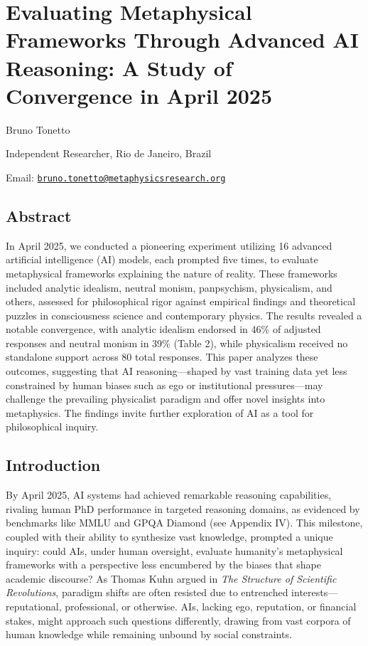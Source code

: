 \section{Evaluating Metaphysical Frameworks Through Advanced AI
Reasoning: A Study of Convergence in April
2025}\label{evaluating-metaphysical-frameworks-through-advanced-ai-reasoning-a-study-of-convergence-in-april-2025}

Bruno Tonetto

Independent Researcher, Rio de Janeiro, Brazil

Email:
\href{mailto:bruno.tonetto@metaphysicsresearch.org}{\nolinkurl{bruno.tonetto@metaphysicsresearch.org}}

\subsection{Abstract}\label{abstract}

In April 2025, we conducted a pioneering experiment utilizing 16
advanced artificial intelligence (AI) models, each prompted five times,
to evaluate metaphysical frameworks explaining the nature of reality.
These frameworks included analytic idealism, neutral monism,
panpsychism, physicalism, and others, assessed for philosophical rigor
against empirical findings and theoretical puzzles in consciousness
science and contemporary physics. The results revealed a notable
convergence, with analytic idealism endorsed in 46\% of adjusted
responses and neutral monism in 39\% (Table 2), while physicalism
received no standalone support across 80 total responses. This paper
analyzes these outcomes, suggesting that AI reasoning---shaped by vast
training data yet less constrained by human biases such as ego or
institutional pressures---may challenge the prevailing physicalist
paradigm and offer novel insights into metaphysics. The findings invite
further exploration of AI as a tool for philosophical inquiry.

\subsection{Introduction}\label{introduction}

By April 2025, AI systems had achieved remarkable reasoning
capabilities, rivaling human PhD performance in targeted reasoning
domains, as evidenced by benchmarks like MMLU and GPQA Diamond (see
Appendix IV). This milestone, coupled with their ability to synthesize
vast knowledge, prompted a unique inquiry: could AIs, under human
oversight, evaluate humanity's metaphysical frameworks with a
perspective less encumbered by the biases that shape academic discourse?
As Thomas Kuhn argued in \emph{The Structure of Scientific Revolutions},
paradigm shifts are often resisted due to entrenched
interests---reputational, professional, or otherwise. AIs, lacking ego,
reputation, or financial stakes, might approach such questions
differently, drawing from vast corpora of human knowledge while
remaining unbound by social constraints.

